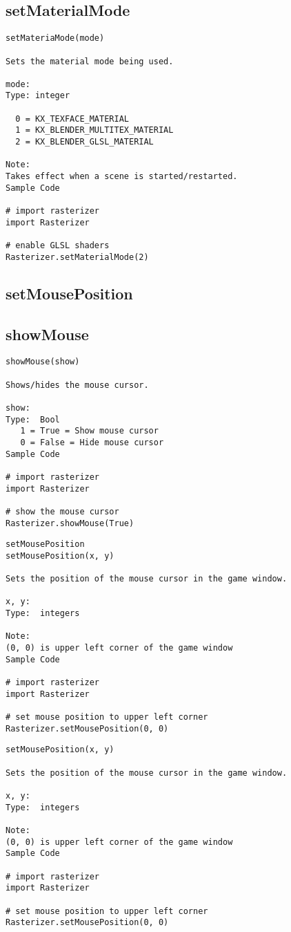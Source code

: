 \subsection{setMaterialMode}
\begin{verbatim}
setMateriaMode(mode)

Sets the material mode being used.

mode:
Type: integer

  0 = KX_TEXFACE_MATERIAL
  1 = KX_BLENDER_MULTITEX_MATERIAL
  2 = KX_BLENDER_GLSL_MATERIAL

Note:
Takes effect when a scene is started/restarted.
Sample Code

# import rasterizer
import Rasterizer

# enable GLSL shaders
Rasterizer.setMaterialMode(2)
\end{verbatim}


\subsection{setMousePosition}
\subsection{showMouse}

\begin{verbatim}
showMouse(show)

Shows/hides the mouse cursor.

show:
Type:  Bool
   1 = True = Show mouse cursor
   0 = False = Hide mouse cursor
Sample Code

# import rasterizer
import Rasterizer

# show the mouse cursor
Rasterizer.showMouse(True)
\end{verbatim}
\begin{verbatim}setMousePosition
setMousePosition(x, y)

Sets the position of the mouse cursor in the game window.

x, y:
Type:  integers

Note:
(0, 0) is upper left corner of the game window
Sample Code

# import rasterizer
import Rasterizer

# set mouse position to upper left corner
Rasterizer.setMousePosition(0, 0)
\end{verbatim}

\begin{verbatim}
setMousePosition(x, y)

Sets the position of the mouse cursor in the game window.

x, y:
Type:  integers

Note:
(0, 0) is upper left corner of the game window
Sample Code

# import rasterizer
import Rasterizer

# set mouse position to upper left corner
Rasterizer.setMousePosition(0, 0)
\end{verbatim}


